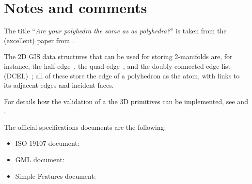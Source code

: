 %
\section{Notes and comments}

The title ``\emph{Are your polyhedra the same as as polyhedra?}'' is taken from the (excellent) paper from \citet{Grunbaum03}.

The 2D GIS data structures that can be used for storing 2-manifolds are, for instance, the half-edge~\citep{Mantyla88}, the quad-edge~\citep{Guibas85}, and the doubly-connected edge list (DCEL)~\citep{Muller78}; all of these store the edge of a polyhedron as the atom, with links to its adjacent edges and incident faces.

For details how the validation of a the 3D primitives can be implemented, see \citet{13_cacaie} and \citet{18_ogdss_val3dity}.

The official specifications documents are the following:
\begin{itemize}
  \item ISO 19107 document: \citet{ISO19107}
  \item GML document: \citet{OGC-GML}
  \item Simple Features document: \citet{OGC-SF}
\end{itemize}
